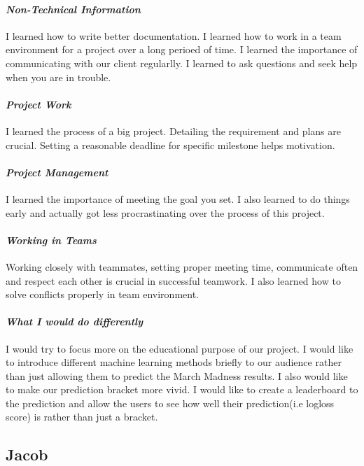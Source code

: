 \documentclass[onecolumn, draftclsnofoot,10pt, compsoc]{IEEEtran}
\begin{document}
\paragraph{\emph{Non-Technical Information}}
I learned how to write better documentation. I learned how to work in a team environment for a project over a long perioed of time. I learned the importance of communicating with our client regularlly. I learned to ask questions and seek help when you are in trouble. 
\paragraph{\emph{Project Work}}
I learned the process of a big project. Detailing the requirement and plans are crucial. Setting a reasonable deadline for specific milestone helps motivation. 
\paragraph{\emph{Project Management}}
I learned the importance of meeting the goal you set. I also learned to do things early and actually got less procrastinating over the process of this project.
\paragraph{\emph{Working in Teams}}
Working closely with teammates, setting proper meeting time, communicate often and respect each other is crucial in successful teamwork. I also learned how to solve conflicts properly in team environment.
\paragraph{\emph{What I would do differently}}
I would try to focus more on the educational purpose of our project. I would like to introduce different machine learning methods briefly to our audience rather than just allowing them to predict the March Madness results. I also would like to make our prediction bracket more vivid. I would like to create a leaderboard to the prediction and allow the users to see how well their prediction(i.e logloss score) is rather than just a bracket.


\subsection{Jacob}

\appendices
\end{document}
